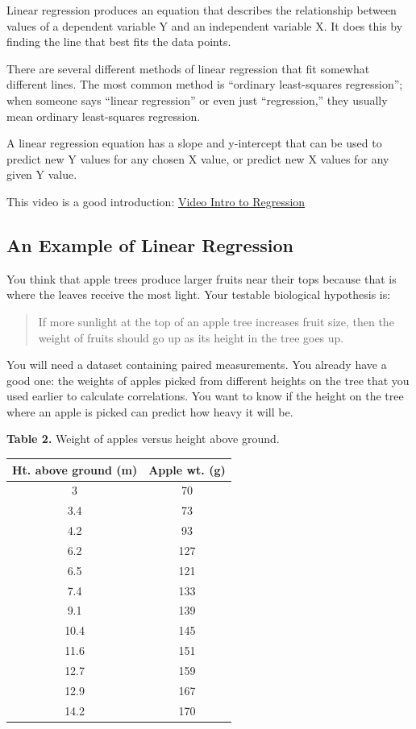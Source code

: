 \documentclass[
]{book}
\begin{document}
Linear regression produces an equation that describes the relationship between values of a dependent variable Y and an independent variable X. It does this by finding the line that best fits the data points.

There are several different methods of linear regression that fit somewhat different lines. The most common method is ``ordinary least-squares regression''; when someone says ``linear regression'' or even just ``regression,'' they usually mean ordinary least-squares regression.

A linear regression equation has a slope and y-intercept that can be used to predict new Y values for any chosen X value, or predict new X values for any given Y value.

This video is a good introduction: \href{https://youtu.be/WWqE7YHR4Jc}{Video Intro to Regression}

\hypertarget{an-example-of-linear-regression}{%
\subsection{An Example of Linear Regression}\label{an-example-of-linear-regression}}

You think that apple trees produce larger fruits near their tops because that is where the leaves receive the most light. Your testable biological hypothesis is:

\begin{quote}
If more sunlight at the top of an apple tree increases fruit size, then the weight of fruits should go up as its height in the tree goes up.
\end{quote}

You will need a dataset containing paired measurements. You already have a good one: the weights of apples picked from different heights on the tree that you used earlier to calculate correlations. You want to know if the height on the tree where an apple is picked can predict how heavy it will be.

\textbf{Table 2.} Weight of apples versus height above ground.

\begin{longtable}[]{@{}cc@{}}
\toprule
Ht. above ground (m) & Apple wt. (g) \\
\midrule
\endhead
3 & 70 \\
3.4 & 73 \\
4.2 & 93 \\
6.2 & 127 \\
6.5 & 121 \\
7.4 & 133 \\
9.1 & 139 \\
10.4 & 145 \\
11.6 & 151 \\
12.7 & 159 \\
12.9 & 167 \\
14.2 & 170 \\
\bottomrule
\end{longtable}
\end{document}
